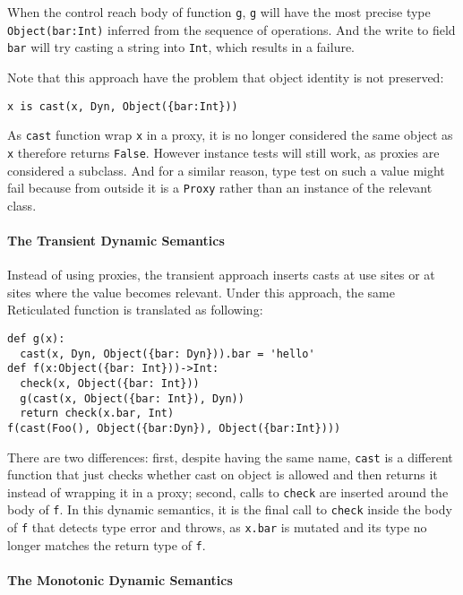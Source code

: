 When the control reach body of function \texttt{g},
\texttt{g} will have the most precise type \texttt{Object({bar:Int})} inferred from the sequence
of operations. And the write to field \texttt{bar} will try casting a string into \texttt{Int},
which results in a failure.

Note that this approach have the problem that object identity is not preserved:

\begin{verbatim}
x is cast(x, Dyn, Object({bar:Int}))
\end{verbatim}

As \texttt{cast} function wrap \texttt{x} in a proxy, it is no longer considered the same object as \texttt{x}
therefore returns \texttt{False}. However instance tests will still work, as proxies are considered a subclass.
And for a similar reason, type test on such a value might fail because from outside it is a \texttt{Proxy}
rather than an instance of the relevant class.

\paragraph{The Transient Dynamic Semantics}

Instead of using proxies, the transient approach inserts casts at use sites or at sites where
the value becomes relevant. Under this approach, the same Reticulated function is translated as following:

\begin{verbatim}
def g(x):
  cast(x, Dyn, Object({bar: Dyn})).bar = 'hello'
def f(x:Object({bar: Int}))->Int:
  check(x, Object({bar: Int}))
  g(cast(x, Object({bar: Int}), Dyn))
  return check(x.bar, Int)
f(cast(Foo(), Object({bar:Dyn}), Object({bar:Int})))
\end{verbatim}

There are two differences: first, despite having the same name, \texttt{cast} is a different
function that just checks whether cast on object is allowed and then returns it instead
of wrapping it in a proxy; second, calls to \texttt{check} are inserted around the body of \texttt{f}.
In this dynamic semantics, it is the final call to \texttt{check} inside the body of \texttt{f} that
detects type error and throws, as \texttt{x.bar} is mutated and its type no longer matches the return
type of \texttt{f}.

\paragraph{The Monotonic Dynamic Semantics}

